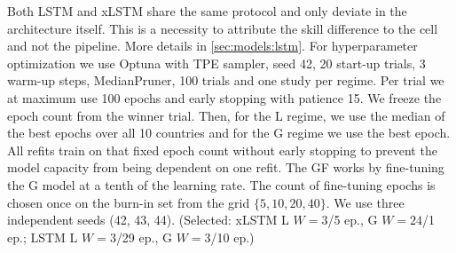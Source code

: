 
Both LSTM and xLSTM share the same protocol and only deviate in the architecture itself. This is a necessity to attribute the skill difference to the cell and not the pipeline. More details in \cref{sec:models:lstm}. For hyperparameter optimization we use Optuna with TPE sampler, seed 42, 20 start-up trials, 3 warm-up steps, MedianPruner, 100 trials and one study per regime. Per trial we at maximum use 100 epochs and early stopping with patience 15. We freeze the epoch count from the winner trial. Then, for the L regime, we use the median of the best epochs over all 10 countries and for the G regime we use the best epoch. All refits train on that fixed epoch count without early stopping to prevent the model capacity from being dependent on one refit. The GF works by fine-tuning the G model at a tenth of the learning rate. The count of fine-tuning epochs is chosen once on the burn-in set from the grid $\{5, 10, 20, 40\}$. We use three independent seeds (42, 43, 44). (Selected: xLSTM L $W=3$/5 ep., G $W=24$/1 ep.;
LSTM L $W=3$/29 ep., G $W=3$/10 ep.)




